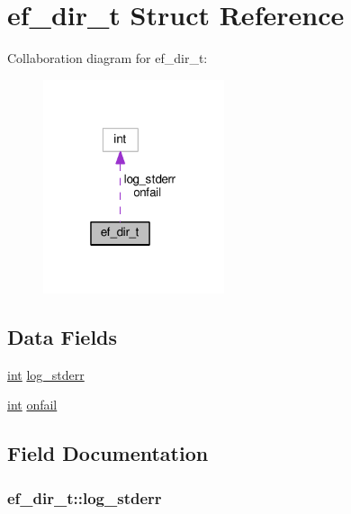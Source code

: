 \hypertarget{structef__dir__t}{}\section{ef\+\_\+dir\+\_\+t Struct Reference}
\label{structef__dir__t}


Collaboration diagram for ef\+\_\+dir\+\_\+t\+:
\nopagebreak
\begin{figure}[H]
\begin{center}
\leavevmode
\includegraphics[width=151pt]{structef__dir__t__coll__graph}
\end{center}
\end{figure}
\subsection*{Data Fields}
\begin{DoxyCompactItemize}
\item 
\hyperlink{pcre_8txt_a42dfa4ff673c82d8efe7144098fbc198}{int} \hyperlink{structef__dir__t_a9c6a432b7b822edd40bdc1c217593d0f}{log\+\_\+stderr}
\item 
\hyperlink{pcre_8txt_a42dfa4ff673c82d8efe7144098fbc198}{int} \hyperlink{structef__dir__t_a3cc0345bf3c5a17621eb77c91d77029b}{onfail}
\end{DoxyCompactItemize}


\subsection{Field Documentation}
\subsubsection[{\texorpdfstring{log\+\_\+stderr}{log_stderr}}]{ ef\+\_\+dir\+\_\+t\+::log\+\_\+stderr}\hypertarget{structef__dir__t_a9c6a432b7b822edd40bdc1c217593d0f}{}\label{structef__dir__t_a9c6a432b7b822edd40bdc1c217593d0f}
